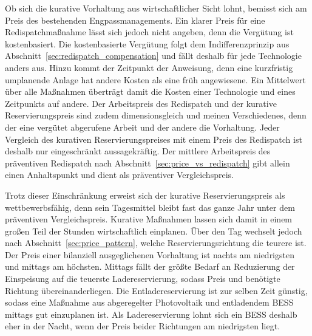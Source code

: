 Ob sich die kurative Vorhaltung aus wirtschaftlicher Sicht lohnt, bemisst sich am Preis des bestehenden Engpassmanagements.
Ein klarer Preis für eine Redispatchmaßnahme lässt sich jedoch nicht angeben, denn die Vergütung ist kostenbasiert.
Die kostenbasierte Vergütung folgt dem Indifferenzprinzip aus Abschnitt~\ref{sec:redispatch_compensation} und fällt deshalb für jede Technologie anders aus.
Hinzu kommt der Zeitpunkt der Anweisung, denn eine kurzfristig umplanende Anlage hat andere Kosten als eine früh angewiesene.
Ein Mittelwert über alle Maßnahmen überträgt damit die Kosten einer Technologie und eines Zeitpunkts auf andere.
Der Arbeitspreis des Redispatch und der kurative Reservierungspreis sind zudem dimensionsgleich und meinen Verschiedenes, denn der eine vergütet abgerufene Arbeit und der andere die Vorhaltung.
Jeder Vergleich des kurativen Reservierungspreises mit einem Preis des Redispatch ist deshalb nur eingeschränkt aussagekräftig.
Der mittlere Arbeitspreis des präventiven Redispatch nach Abschnitt~\ref{sec:price_vs_redispatch} gibt allein einen Anhaltspunkt und dient als präventiver Vergleichspreis.

Trotz dieser Einschränkung erweist sich der kurative Reservierungspreis als wettbewerbsfähig, denn sein Tagesmittel bleibt fast das ganze Jahr unter dem präventiven Vergleichspreis.
Kurative Maßnahmen lassen sich damit in einem großen Teil der Stunden wirtschaftlich einplanen.
Über den Tag wechselt jedoch nach Abschnitt~\ref{sec:price_pattern}, welche Reservierungsrichtung die teurere ist.
Der Preis einer bilanziell ausgeglichenen Vorhaltung ist nachts am niedrigsten und mittags am höchsten.
Mittags fällt der größte Bedarf an Reduzierung der Einspeisung auf die teuerste Ladereservierung, sodass Preis und benötigte Richtung übereinanderliegen.
Die Entladereservierung ist zur selben Zeit günstig, sodass eine Maßnahme aus abgeregelter Photovoltaik und entladendem \ac{BESS} mittags gut einzuplanen ist.
Als Ladereservierung lohnt sich ein \ac{BESS} deshalb eher in der Nacht, wenn der Preis beider Richtungen am niedrigsten liegt.

